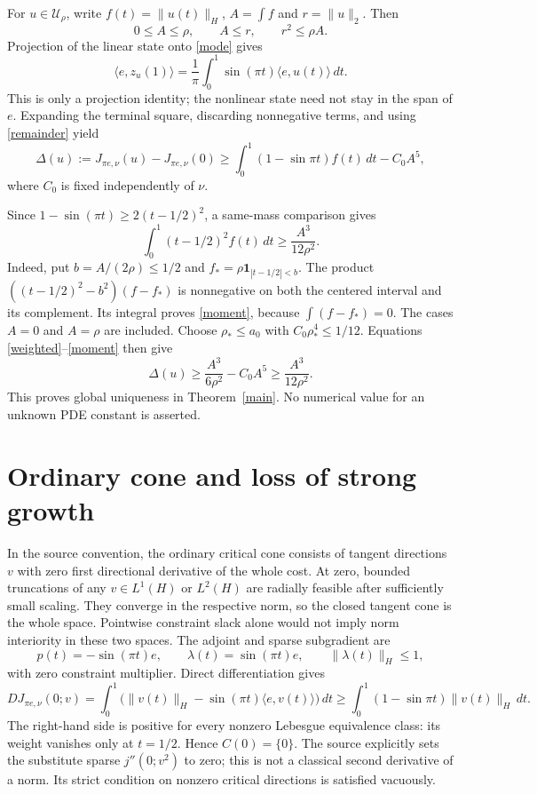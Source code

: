 \documentclass[11pt]{article}
\newcommand{\U}{\mathcal U_\rho}
\newcommand{\norm}[1]{\lVert #1\rVert}
\newcommand{\ip}[2]{\langle #1,#2\rangle}
\begin{document}
For $u\in\U$, write $f(t)=\norm{u(t)}_H$, $A=\int f$ and $r=\norm u_2$.
Then
\begin{equation}\label{cap}
 0\le A\le\rho,\qquad A\le r,\qquad r^2\le\rho A.
\end{equation}
Projection of the linear state onto \eqref{mode} gives
\begin{equation}\label{endpoint}
 \ip e{z_u(1)}=\frac1\pi\int_0^1\sin(\pi t)\ip e{u(t)}\,dt.
\end{equation}
This is only a projection identity; the nonlinear state need not stay in
the span of $e$. Expanding the terminal square, discarding nonnegative
terms, and using \eqref{remainder} yield
\begin{equation}\label{weighted}
 \Delta(u):=J_{\pi e,\nu}(u)-J_{\pi e,\nu}(0)
 \ge\int_0^1(1-\sin\pi t)f(t)\,dt-C_0 A^5,
\end{equation}
where $C_0$ is fixed independently of $\nu$.

Since $1-\sin(\pi t)\ge2(t-1/2)^2$, a same-mass comparison gives
\begin{equation}\label{moment}
 \int_0^1(t-1/2)^2 f(t)\,dt\ge\frac{A^3}{12\rho^2}.
\end{equation}
Indeed, put $b=A/(2\rho)\le1/2$ and
$f_*=\rho\mathbf1_{|t-1/2|<b}$. The product
$((t-1/2)^2-b^2)(f-f_*)$ is nonnegative on both the centered interval
and its complement. Its integral proves \eqref{moment}, because
$\int(f-f_*)=0$. The cases $A=0$ and $A=\rho$ are included.
Choose $\rho_*\le a_0$ with $C_0\rho_*^4\le1/12$. Equations
\eqref{weighted}--\eqref{moment} then give
\[
 \Delta(u)\ge\frac{A^3}{6\rho^2}-C_0A^5
              \ge\frac{A^3}{12\rho^2}.
\]
This proves global uniqueness in Theorem~\ref{main}. No numerical value
for an unknown PDE constant is asserted.

\section{Ordinary cone and loss of strong growth}

In the source convention, the ordinary critical cone consists of tangent
directions $v$ with zero first directional derivative of the whole cost.
At zero, bounded truncations of any $v\in L^1(H)$ or $L^2(H)$ are radially
feasible after sufficiently small scaling. They converge in the respective
norm, so the closed tangent cone is the whole space. Pointwise constraint
slack alone would not imply norm interiority in these two spaces.
The adjoint and sparse subgradient are
\[
 p(t)=-\sin(\pi t)e,\qquad \lambda(t)=\sin(\pi t)e,
 \qquad\norm{\lambda(t)}_H\le1,
\]
with zero constraint multiplier. Direct differentiation gives
\begin{equation}\label{first}
 DJ_{\pi e,\nu}(0;v)
  =\int_0^1\big(\norm{v(t)}_H-\sin(\pi t)\ip e{v(t)}\big)\,dt
  \ge\int_0^1(1-\sin\pi t)\norm{v(t)}_H\,dt.
\end{equation}
The right-hand side is positive for every nonzero Lebesgue equivalence
class: its weight vanishes only at $t=1/2$. Hence $C(0)=\{0\}$.
The source explicitly sets the substitute sparse $j''(0;v^2)$ to zero;
this is not a classical second derivative of a norm. Its strict condition
on nonzero critical directions is satisfied vacuously.
\end{document}
